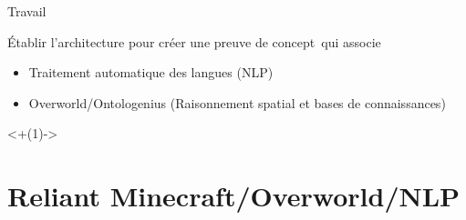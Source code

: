 \documentclass[aspectratio=169]{audition-beamer}
\begin{document}
\begin{frame}{Travail}

  \vfill
  Établir l'architecture pour créer une preuve de concept\pause\ qui associe
  \begin{itemize}
    \item Traitement automatique des langues (NLP)
    \item Overworld/Ontologenius (Raisonnement spatial et bases de connaissances)
  \end{itemize}


  \onslide<+(1)->{\tableofcontents[subsectionstyle=hide/hide/hide]}

\end{frame}

\section{Reliant Minecraft/Overworld/NLP}
\end{document}
